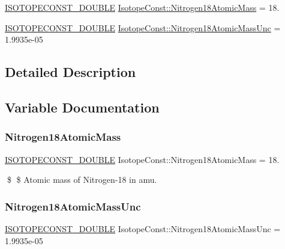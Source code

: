 \begin{DoxyCompactItemize}
\item 
\mbox{\hyperlink{group___isotope_const-_macros_ga8f45a7272ce02c0b4c65c44636ed719a}{I\+S\+O\+T\+O\+P\+E\+C\+O\+N\+S\+T\+\_\+\+D\+O\+U\+B\+LE}} \mbox{\hyperlink{group___isotope_const-_nitrogen-_n18_ga31884b135bb91d06968ae7dfd4205e5c}{Isotope\+Const\+::\+Nitrogen18\+Atomic\+Mass}} = 18.
\item 
\mbox{\hyperlink{group___isotope_const-_macros_ga8f45a7272ce02c0b4c65c44636ed719a}{I\+S\+O\+T\+O\+P\+E\+C\+O\+N\+S\+T\+\_\+\+D\+O\+U\+B\+LE}} \mbox{\hyperlink{group___isotope_const-_nitrogen-_n18_gad0db1e379269fe5fa8d668ab98ad7c38}{Isotope\+Const\+::\+Nitrogen18\+Atomic\+Mass\+Unc}} = 1.\+9935e-\/05
\end{DoxyCompactItemize}


\subsection{Detailed Description}


\subsection{Variable Documentation}
\mbox{\label{group___isotope_const-_nitrogen-_n18_ga31884b135bb91d06968ae7dfd4205e5c}} 
\subsubsection{\texorpdfstring{Nitrogen18\+Atomic\+Mass}{Nitrogen18AtomicMass}}
{\footnotesize\ttfamily \mbox{\hyperlink{group___isotope_const-_macros_ga8f45a7272ce02c0b4c65c44636ed719a}{I\+S\+O\+T\+O\+P\+E\+C\+O\+N\+S\+T\+\_\+\+D\+O\+U\+B\+LE}} Isotope\+Const\+::\+Nitrogen18\+Atomic\+Mass = 18.}

\$ \$ Atomic mass of Nitrogen-\/18 in amu. \mbox{\label{group___isotope_const-_nitrogen-_n18_gad0db1e379269fe5fa8d668ab98ad7c38}} 
\subsubsection{\texorpdfstring{Nitrogen18\+Atomic\+Mass\+Unc}{Nitrogen18AtomicMassUnc}}
{\footnotesize\ttfamily \mbox{\hyperlink{group___isotope_const-_macros_ga8f45a7272ce02c0b4c65c44636ed719a}{I\+S\+O\+T\+O\+P\+E\+C\+O\+N\+S\+T\+\_\+\+D\+O\+U\+B\+LE}} Isotope\+Const\+::\+Nitrogen18\+Atomic\+Mass\+Unc = 1.\+9935e-\/05}

